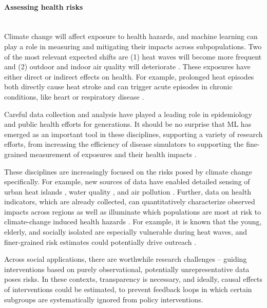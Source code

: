 \documentclass[11pt]{report}
\newcommand{\Gap}{\texorpdfstring{\hfill}{}}
\begin{document}
\paragraph*{Assessing health risks}\Gap\mbox{}\\Climate change will affect exposure to
health hazards, and machine learning can play a role in measuring and mitigating
their impacts across subpopulations. Two of the most relevant expected shifts
are (1) heat waves will become more frequent and (2) outdoor and indoor air quality will
deteriorate \cite{haines2006climate, sarofim2016impacts}. These exposures have
either direct or indirect effects on health. For example, prolonged heat
episodes both directly cause heat stroke and can trigger acute episodes in chronic
conditions, like heart or respiratory disease \cite{schwartz2004hospital,
dominici2006fine}.

Careful data collection and analysis have played a leading role in
epidemiology and public health efforts for generations. It should be no surprise that ML has emerged as
an important tool in these disciplines, supporting a variety of research
efforts, from increasing the efficiency of disease simulators to supporting the
fine-grained measurement of exposures and their health impacts
\cite{khoury2013transforming, salathe2012digital}.

These disciplines are increasingly focused on the risks posed by climate change
specifically. For example, new sources of data have enabled detailed sensing of
urban heat islands \cite{clinton2013modis, ho2014mapping, voelkel2016peer},
water quality \cite{hafeez2019comparison, koditala2018water}, and air pollution
\cite{di2018machine, chen2018op}. Further, data on health indicators, which are
already collected, can quantitatively characterize observed impacts across
regions as well as illuminate which populations are most at risk to
climate-change induced health hazards \cite{watts2017lancet}. For example, it is
known that the young, elderly, and socially isolated are especially vulnerable
during heat waves, and finer-grained risk estimates could potentially drive
outreach \cite{pentland2009using, rose2013mortality}.

Across social applications, there are worthwhile research challenges -- guiding
interventions based on purely observational, potentially unrepresentative
data poses risks. In these contexts, transparency is necessary, and ideally,
causal effects of interventions could be estimated, to prevent feedback loops in
which certain subgroups are systematically ignored from policy interventions.
\end{document}
